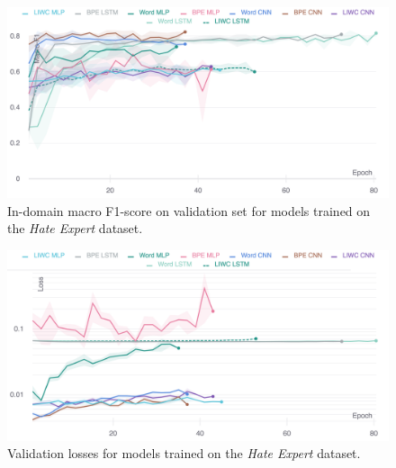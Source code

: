 \begin{figure}
    \centering
    \includegraphics[width=\textwidth]{waseem_dev_f1.pdf}
    \caption{In-domain macro F1-score on validation set for models trained on the \textit{Hate Expert} dataset.}
    \label{fig:waseem_dev_f1}
\end{figure}
\begin{figure}
    \centering
    \includegraphics[width=\textwidth]{waseem_dev_loss_stderr_logscale.pdf}
    \caption{Validation losses for models trained on the \textit{Hate Expert} dataset.}
    \label{fig:waseem_dev_loss}
\end{figure}

